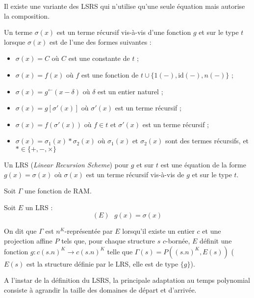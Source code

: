 		Il existe une variante des LSRS qui n'utilise qu'une seule équation mais autorise la composition.
		
		\begin{definition}
			Un terme $\sigma(x)$ est un terme récursif vis-à-vis d'une fonction $g$ et sur le type $t$ lorsque $\sigma(x)$ est de l'une des formes suivantes :
			
			\begin{itemize}[itemsep=-1mm]
				\item 	$\sigma(x) = C$ où $C$ est une constante de $t$ ;
				\item 	$\sigma(x) = f(x)$ où $f$ est une fonction de $t\cup \{1(-), \text{id}(-), n(-) \}$ ;
				\item 	$\sigma(x) = g^{\leftarrow}(x-\delta)$ où $\delta$ est un entier naturel ;
				\item 	$\sigma(x) = g\left[ \sigma'(x)\right]$ où $\sigma'(x)$ est un terme récursif ;
				\item 	$\sigma(x) = f(\sigma'(x))$ où $f \in t$ et $\sigma'(x)$ est un terme récursif ;
				\item 	$\sigma(x) = \sigma_1(x) * \sigma_2(x)$ où $\sigma_1(x)$ et $\sigma_2(x)$ sont des termes récursifs, et $* \in \{+, -, \times\}$
			\end{itemize}
		\end{definition}
		
		\begin{definition}[LRS]
			Un LRS (\emph{Linear Recursion Scheme}) pour $g$ et sur $t$ est une équation de la forme $g(x) = \sigma(x)$ où $\sigma(x)$ est un terme récursif vis-à-vis de $g$ et sur le type $t$.
		\end{definition}
		
		\begin{definition}
			\label{def:representee_par_LRS}
			Soit $\Gamma$ une fonction de RAM. 
			
			Soit $E$ un LRS :
			\[
			(E) \ \ \ g(x) = \sigma(x)
			\]
			
			On dit que $\Gamma$ est $n^K$-représentée par $E$ lorsqu'il existe un entier $c$ et une projection affine $P$ tels que, pour chaque structure $s$ $c$-bornée, $E$ définit une fonction $g : c (s.n)^K \to c (s.n)^K$ telle que $\Gamma(s) = P\left((s.n)^K, E(s)\right)$ ($E(s)$ est la structure définie par le LRS, elle est de type $\{g\}$).
		\end{definition}
		
		A l'instar de la définition du LSRS, la principale adaptation au temps polynomial consiste à agrandir la taille des domaines de départ et d'arrivée.
		
